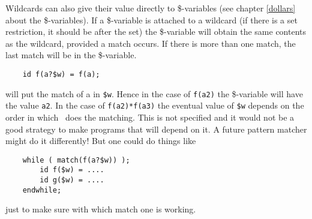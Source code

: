 Wildcards can also give their value directly to
\$-variables (see chapter
\ref{dollars} about the \$-variables). If a \$-variable is attached to a
wildcard (if there is a set restriction, it should be after the set) the
\$-variable will obtain the same contents as the wildcard, provided a match
occurs. If there is more than one match, the last match will be in the
\$-variable.
\begin{verbatim}
    id f(a?$w) = f(a);
\end{verbatim}
will put the match of a in \verb:$w:. Hence in the case of \verb:f(a2): the 
\$-variable will have the value \verb:a2:. In the case of 
\verb:f(a2)*f(a3): the eventual value of \verb:$w: depends on the order in 
which \FORM\ does the matching. This is not specified and it would not be 
a good strategy to make programs that will depend on it. A future pattern 
matcher might do it differently! But one could do things like
\begin{verbatim}
    while ( match(f(a?$w)) );
        id f($w) = ....
        id g($w) = ....
    endwhile;
\end{verbatim}
just to make sure with which match one is working.

